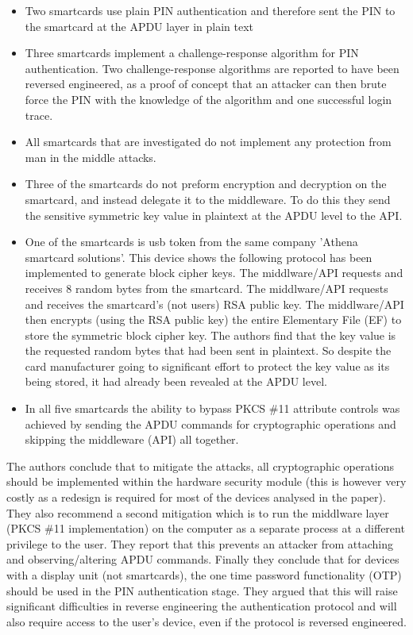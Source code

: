 \documentclass[bsc,frontabs,twoside,singlespacing,parskip,deptreport]{infthesis}     %
\begin{document}
\begin{itemize}
\item Two smartcards use plain PIN authentication and therefore sent the PIN to the smartcard at the APDU layer in plain text

\item Three smartcards implement a challenge-response algorithm for PIN authentication. Two challenge-response algorithms are reported to have been reversed engineered, as a proof of concept that an attacker can then brute force the PIN with the knowledge of the algorithm and one successful login trace.

\item All smartcards that are investigated do not implement any protection from man in the middle attacks.
\item Three of the smartcards do not preform encryption and decryption on the smartcard, and instead delegate it to the middleware. To do this they send the sensitive symmetric key value in plaintext at the APDU level to the API.

\item One of the smartcards is usb token from the same company 'Athena smartcard solutions'. This device shows the following protocol has been implemented to generate block cipher keys. The middlware/API requests and receives 8 random bytes from the smartcard. The middlware/API requests and receives the smartcard's (not users) RSA public key. The middlware/API then encrypts (using the RSA public key) the entire Elementary File (EF) to store the symmetric block cipher key. The authors find that the key value is the requested random bytes that had been sent in plaintext. So despite the card manufacturer going to significant effort to protect the key value as its being stored, it had already been revealed at the APDU level.

\item In all five smartcards the ability to bypass PKCS \#11 attribute controls was achieved by sending the APDU commands for cryptographic operations and skipping the middleware (API) all together.
\end{itemize}


The authors conclude that to mitigate the attacks, all cryptographic operations should be implemented within the hardware security module (this is however very costly as a redesign is required for most of the devices analysed in the paper). They also recommend a second mitigation which is to run the middlware layer (PKCS \#11 implementation) on the computer as a separate process at a different privilege to the user. They report that this prevents an attacker from attaching and observing/altering APDU commands. Finally they conclude that for devices with a display unit (not smartcards), the one time password functionality (OTP) should be used in the PIN authentication stage. They argued that this will raise significant difficulties in reverse engineering the authentication protocol and will also require access to the user's device, even if the protocol is reversed engineered.
\end{document}
